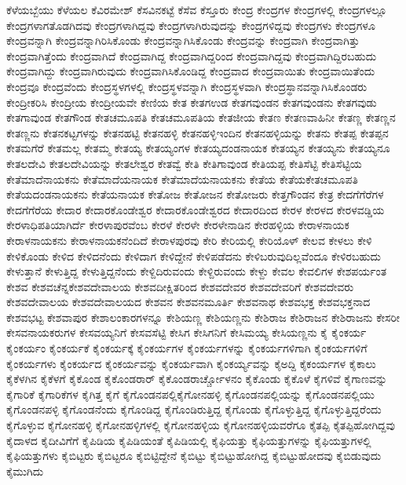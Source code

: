 {ಕೆಳೆಯಬ್ಬೆಯು
ಕೆಳೆಯಲ
ಕೆವಿರಮೇಶ್
ಕೆಸವಿನಕಟ್ಟೆ
ಕೆಸೆವ
ಕೆಸ್ತೂರು
ಕೇಂದ್ರ
ಕೇಂದ್ರಗಳ
ಕೇಂದ್ರಗಳಲ್ಲಿ
ಕೇಂದ್ರಗಳಲ್ಲೂ
ಕೇಂದ್ರಗಳಾಗತೊಡಗಿದವು
ಕೇಂದ್ರಗಳಾಗಿದ್ದವು
ಕೇಂದ್ರಗಳಾಗಿರುವುದನ್ನು
ಕೇಂದ್ರಗಳಿದ್ದವು
ಕೇಂದ್ರಗಳು
ಕೇಂದ್ರಗಳೂ
ಕೇಂದ್ರವನ್ನಾಗಿ
ಕೇಂದ್ರವನ್ನಾಗಿರಿಸಿಕೊಂಡು
ಕೇಂದ್ರವನ್ನಾಗಿಸಿಕೊಂಡು
ಕೇಂದ್ರವನ್ನು
ಕೇಂದ್ರವಾಗಿ
ಕೇಂದ್ರವಾಗಿತ್ತು
ಕೇಂದ್ರವಾಗಿತ್ತೆಂದು
ಕೇಂದ್ರವಾಗಿದೆ
ಕೇಂದ್ರವಾಗಿದ್ದ
ಕೇಂದ್ರವಾಗಿದ್ದರಿಂದ
ಕೇಂದ್ರವಾಗಿದ್ದವು
ಕೇಂದ್ರವಾಗಿದ್ದಿರಬಹುದು
ಕೇಂದ್ರವಾಗಿದ್ದು
ಕೇಂದ್ರವಾಗಿರುವುದು
ಕೇಂದ್ರವಾಗಿಸಿಕೊಂಡಿದ್ದ
ಕೇಂದ್ರವಾದ
ಕೇಂದ್ರವಾಯಿತು
ಕೇಂದ್ರವಾಯಿತೆಂದು
ಕೇಂದ್ರವೂ
ಕೇಂದ್ರವೆಂದು
ಕೇಂದ್ರಸ್ಥಳಗಳಲ್ಲಿ
ಕೇಂದ್ರಸ್ಥಳವನ್ನಾಗಿ
ಕೇಂದ್ರಸ್ಥಳವಾಗಿ
ಕೇಂದ್ರಸ್ಥಾನವನ್ನಾಗಿಸಿಕೊಂಡರು
ಕೇಂದ್ರೀಕರಿಸಿ
ಕೇಂದ್ರೀಯ
ಕೇಂದ್ರೀಯವೇ
ಕೇಣಿಯ
ಕೇತ
ಕೇತಗಉಡ
ಕೇತಗವುಂಡನ
ಕೇತಗವುಂಡನು
ಕೇತಗವುಡು
ಕೇತಗಾವುಂಡ
ಕೇತಗೌಂಡ
ಕೇತಚಮೂಪತಿ
ಕೇತಚಮೂಪತಿಯ
ಕೇತಜೀಯ
ಕೇತಣ
ಕೇತಣವಾಹಿನೀ
ಕೇತಣ್ಣ
ಕೇತಣ್ಣನ
ಕೇತಣ್ಣನು
ಕೇತನಕಟ್ಟಗಳನ್ನು
ಕೇತನಹಟ್ಟಿ
ಕೇತನಹಳ್ಳಿ
ಕೇತನಹಳ್ಳಿಇಂದಿನ
ಕೇತನಹಳ್ಳಿಯನ್ನು
ಕೇತನು
ಕೇತಪ್ಪ
ಕೇತಪ್ಪನ
ಕೇತಮಗೆರೆ
ಕೇತಮಲ್ಲ
ಕೇತಮ್ಮ
ಕೇತಯ್ಯ
ಕೇತಯ್ಯಂಗಳ
ಕೇತಯ್ಯದಂಡನಾಯಕ
ಕೇತಯ್ಯನ
ಕೇತಯ್ಯನು
ಕೇತಯ್ಯನೂ
ಕೇತಲದೇವಿ
ಕೇತಲದೇವಿಯನ್ನು
ಕೇತಲೇಶ್ವರ
ಕೇತವ್ವೆ
ಕೇತಿ
ಕೇತಿಗಾವುಂಡ
ಕೇತಿಯಪ್ಪ
ಕೇತಿಸೆಟ್ಟಿ
ಕೇತಿಸೆಟ್ಟಿಯ
ಕೇತೆಮಾದೆನಾಯಕನು
ಕೇತೆಮಾದೆಯನಾಯಕ
ಕೇತೆಮಾದೆಯನಾಯಕನು
ಕೇತೆಯ
ಕೇತೆಯಕೇತಚಮೂಪತಿ
ಕೇತೆಯದಂಡನಾಯಕನು
ಕೇತೆಯನಾಯಕ
ಕೇತೋಜ
ಕೇತೋಜನ
ಕೇತೋಜರು
ಕೇತ್ತಗೌಂಡನ
ಕೇತ್ರ
ಕೇದಗೆಗೆರೆಗಳ
ಕೇದಗೆಗೆರೆಯ
ಕೇದಾರ
ಕೇದಾರಕೊಂಡೇಶ್ವರ
ಕೇದಾರಕೊಂಡೇಶ್ವರದ
ಕೇದಾರದಿಂದ
ಕೇರಳ
ಕೇರಳದ
ಕೇರಳವಡ್ಡಿಯ
ಕೇರಳಾಧಿಪತಿಯಾಗಿರ್ದೆ
ಕೇರಳಾಪುರವೆಂಬ
ಕೇರಳೆ
ಕೇರಳೇ
ಕೇರಳೇನಾಡಿನ
ಕೇರಹಳ್ಳಿಯ
ಕೇರಾಳನಾಯಕ
ಕೇರಾಳನಾಯಕನು
ಕೇರಾಳನಾಯಕನೆಂದಿದೆ
ಕೇರಾಳಪುರವು
ಕೇರಿ
ಕೇರಿಯಲ್ಲಿ
ಕೇರಿಯೊಳ್
ಕೇಲವ
ಕೇಳಲು
ಕೇಳಿ
ಕೇಳಿಕೊಂಡು
ಕೇಳಿದ
ಕೇಳಿದನೆಂದು
ಕೇಳಿದಾಗ
ಕೇಳಿದ್ದೇನೆ
ಕೇಳಿಪಡೆದನು
ಕೇಳಿಬರುವುದಿಲ್ಲವೆಂದೂ
ಕೇಳಿರಬಹುದು
ಕೇಳುತ್ತಾನೆ
ಕೇಳುತ್ತಿದ್ದ
ಕೇಳುತ್ತಿದ್ದನೆಂದು
ಕೇಳ್ದಿದಿರುವಂದು
ಕೇಳ್ದಿರುವಂದು
ಕೇಳ್ದು
ಕೇವಲ
ಕೇವಲಿಗಳ
ಕೇಶಪರ್ಯಂತ
ಕೇಶವ
ಕೇಶವಚೆನ್ನಕೇಶವದೇವಾಲಯ
ಕೇಶವದೀಕ್ಷಿತರಿಂದ
ಕೇಶವದೇವರ
ಕೇಶವದೇವರಿಗೆ
ಕೇಶವದೇವರು
ಕೇಶವದೇವಾಲಯ
ಕೇಶವದೇವಾಲಯದ
ಕೇಶವನ
ಕೇಶವನಮೂರ್ತಿ
ಕೇಶವನಾಥ
ಕೇಶವಭಕ್ತ
ಕೇಶವಭಕ್ತನಾದ
ಕೇಶವಭಟ್ಟ
ಕೇಶವಾಪುರ
ಕೇಶಾಲಂಕಾರಗಳನ್ನೂ
ಕೇಶಿಯಣ್ಣ
ಕೇಶಿಯಣ್ಣನು
ಕೇಶಿರಾಜ
ಕೇಶಿರಾಜನ
ಕೇಶಿರಾಜನು
ಕೇಸರೀ
ಕೇಸವನಾಯಕರುಗಳ
ಕೇಸವಯ್ಯನಿಗೆ
ಕೇಸವಸೆಟ್ಟಿ
ಕೇಸಿಗ
ಕೇಸಿಗನಿಗೆ
ಕೇಸಿಮಯ್ಯ
ಕೇಸಿಯಣ್ಣನು
ಕೈ
ಕೈಂಕರ್ಯ
ಕೈಂಕರ್ಯಂ
ಕೈಂಕರ್ಯಕೆ
ಕೈಂಕರ್ಯಕ್ಕೆ
ಕೈಂಕರ್ಯಗಳ
ಕೈಂಕರ್ಯಗಳನ್ನು
ಕೈಂಕರ್ಯಗಳಿಗಾಗಿ
ಕೈಂಕರ್ಯಗಳಿಗೆ
ಕೈಂಕರ್ಯಗಳು
ಕೈಂಕರ್ಯದ
ಕೈಂಕರ್ಯವನ್ನು
ಕೈಂಕರ್ಯವಾಗಿ
ಕೈಂಕರ್ಯ್ಯವನ್ನು
ಕೈಅದ್ದಿ
ಕೈಕಂರ್ಯಗಳ
ಕೈಕಾಲು
ಕೈಕೆಳಗಿನ
ಕೈಕೆಳಗೆ
ಕೈಕೊಂಡ
ಕೈಕೊಂಡರಾರ್
ಕೈಕೊಂಡರಾರ್ಚ್ಚೋಳನಂ
ಕೈಕೊಂಡು
ಕೈಕೊಳೆ
ಕೈಗಳಿವೆ
ಕೈಗಾಣವನ್ನು
ಕೈಗಾರಿಕೆ
ಕೈಗಾರಿಕೆಗಳ
ಕೈಗಿತ್ತ
ಕೈಗೆ
ಕೈಗೊಂಡನಪಲ್ಲಿಕೈಗೋನಹಳ್ಳಿ
ಕೈಗೊಂಡನಪಲ್ಲಿಯನ್ನು
ಕೈಗೊಂಡನಪಲ್ಲಿಯು
ಕೈಗೊಂಡನಪಳ್ಳಿ
ಕೈಗೊಂಡನೆಂದು
ಕೈಗೊಂಡಿದ್ದ
ಕೈಗೊಂಡಿರುತ್ತಿದ್ದ
ಕೈಗೊಂಡು
ಕೈಗೊಳ್ಳುತ್ತಿದ್ದ
ಕೈಗೊಳ್ಳುತ್ತಿದ್ದರೆಂದು
ಕೈಗೊಳ್ಳುವ
ಕೈಗೋನಹಳ್ಳಿ
ಕೈಗೋನಹಳ್ಳಿಗಳಲ್ಲಿ
ಕೈಗೋನಹಳ್ಳಿಯ
ಕೈಗೋನಹಳ್ಳಿಯವರೆಗೂ
ಕೈತಪ್ಪಿ
ಕೈತಪ್ಪಿಹೋಗಿದ್ದವು
ಕೈದಾಳದ
ಕೈದೀವಿಗೆಗೆ
ಕೈಪಿಡಿಯ
ಕೈಪಿಡಿಯಂತೆ
ಕೈಪಿಡಿಯಲ್ಲಿ
ಕೈಫಿಯತ್ತು
ಕೈಫಿಯತ್ತುಗಳನ್ನು
ಕೈಫಿಯತ್ತುಗಳಲ್ಲಿ
ಕೈಫಿಯತ್ತುಗಳು
ಕೈಬಿಟ್ಟರು
ಕೈಬಿಟ್ಟರೂ
ಕೈಬಿಟ್ಟಿದ್ದೇನೆ
ಕೈಬಿಟ್ಟು
ಕೈಬಿಟ್ಟುಹೋಗಿದ್ದ
ಕೈಬಿಟ್ಟುಹೋದವು
ಕೈಬಿಡುವುದು
ಕೈಮುಗಿದು
}
